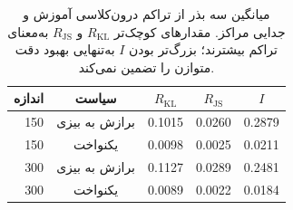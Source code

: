 \begin{table}[htbp]
\centering\small
\caption{میانگین سه بذر از تراکم درون‌کلاسی آموزش و جدایی مراکز. مقدارهای کوچک‌تر $R_{\mathrm{KL}}$ و $R_{\mathrm{JS}}$ به‌معنای تراکم بیشترند؛ بزرگ‌تر بودن $I$ به‌تنهایی بهبود دقت متوازن را تضمین نمی‌کند.}
\label{tab:ch4-sec411-density-separation}
\begin{tabular}{rcccc}\hline
اندازه & سیاست & $R_{\mathrm{KL}}$ & $R_{\mathrm{JS}}$ & $I$\\ \hline
150 & برازش به بیزی & 0.1015 & 0.0260 & 0.2879 \\
150 & یکنواخت & 0.0098 & 0.0025 & 0.0211 \\
300 & برازش به بیزی & 0.1127 & 0.0289 & 0.2481 \\
300 & یکنواخت & 0.0089 & 0.0022 & 0.0184 \\
\hline
\end{tabular}
\end{table}
